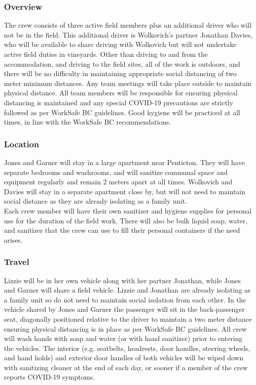 \documentclass[11pt,letter]{article}
\begin{document}
\subsubsection{Overview}
The crew consists of three active field members plus an additional driver who will not be in the field. This additional driver is Wolkovich's partner Jonathan Davies, who will be available to share driving with Wolkovich but will not undertake active field duties in vineyards. Other than driving to and from the accommodation, and driving to the field sites, all of the work is outdoors, and there will be no difficulty in maintaining appropriate social distancing of two meter minimum distances. Any team meetings will take place outside to maintain physical distance. All team members will be responsible for ensuring physical distancing is maintained and any special COVID-19 precautions are strictly followed as per WorkSafe BC guidelines. Good hygiene will be practiced at all times, in line with the  WorkSafe BC recommendations. 

\subsubsection{Location}
Jones and Garner will stay in a large apartment near Penticton. They will have separate bedrooms and washrooms, and will sanitize communal space and equipment regularly and remain 2 meters apart at all times. Wolkovich and Davies will stay in a separate apartment close by, but will not need to maintain social distance as they are already isolating as a family unit. \\

Each crew member will have their own sanitizer and hygiene supplies for personal use for the duration of the field work. There will also be bulk liquid soap, water, and sanitizer that the crew can use to fill their personal containers if the need arises.

\subsubsection {Travel}
Lizzie will be in her own vehicle along with her partner Jonathan, while Jones and Garner will share a field vehicle. Lizzie and Jonathan are already isolating as a family unit so do not need to maintain social isolation from each other. In the vehicle shared by Jones and Garner the passenger will sit in the back-passenger seat, diagonally positioned relative to the driver to maintain a two meter distance ensuring physical distancing is in place as per WorkSafe BC guidelines. All crew will wash hands with soap and water (or with hand sanitizer) prior to entering the vehicles. The interior (e.g. seatbelts, headrests, door handles, steering wheels, and hand holds) and exterior door handles of both vehicles will be wiped down with sanitizing cleaner at the end of each day, or sooner if a member of the crew reports COVID-19 symptoms.
\end{document}
